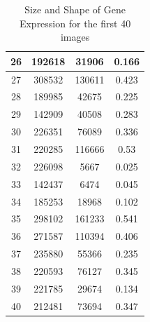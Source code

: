 \documentclass{article}
\begin{document}
\begin{table}[h!]
\begin{tabular}{|c|c|c|c|}
    26  & 192618 & 31906 & 0.166 \\    \hline
    27 & 308532 & 130611 & 0.423  \\    \hline
    28 & 189985 & 42675 & 0.225  \\    \hline
    29 & 142909 & 40508 & 0.283  \\    \hline
    30 & 226351 & 76089 & 0.336  \\    \hline
    31 & 220285 & 116666 & 0.53 \\  \hline
    32 & 226098 & 5667 & 0.025 \\ \hline
    33 & 142437 & 6474 & 0.045 \\ \hline
    34 & 185253 & 18968 & 0.102 \\ \hline
    35 & 298102 & 161233 & 0.541 \\ \hline
    36 & 271587 & 110394 & 0.406 \\ \hline
    37 & 235880 & 55366 & 0.235 \\ \hline
    38 & 220593 & 76127 & 0.345 \\ \hline
    39 & 221785 & 29674 & 0.134 \\ \hline
    40 & 212481 & 73694 & 0.347 \\ \hline
    \end{tabular}
    \caption{Size and Shape of Gene Expression for the first 40 images}
    \label{tab:size_shape_embryo_pt1}
\end{table}
\end{document}
